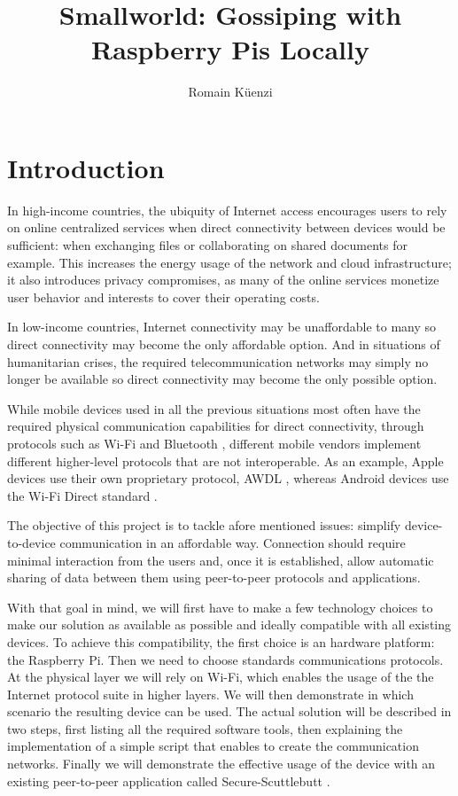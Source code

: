 \documentclass[a4paper,11pt,oneside]{report}
\title{Smallworld: Gossiping with Raspberry Pis Locally}
\author{Romain Küenzi}
\begin{document}
\maketitle

\maketoc

\chapter{Introduction}

In high-income countries, the ubiquity of Internet access encourages users to rely on online centralized services when direct connectivity between devices would be sufficient: when exchanging files or collaborating on shared documents for example. This increases the energy usage of the network and cloud infrastructure; it also introduces privacy compromises, as many of the online services monetize user behavior and interests to cover their operating costs.

In low-income countries, Internet connectivity may be unaffordable to many so direct connectivity may become the only affordable option. And in situations of humanitarian crises, the required telecommunication networks may simply no longer be available so direct connectivity may become the only possible option.

While mobile devices used in all the previous situations most often have the required physical communication capabilities for direct connectivity, through protocols such as Wi-Fi \cite{wifi2016} and Bluetooth \cite{bluetooth}, different mobile vendors implement different higher-level protocols that are not interoperable. As an example, Apple devices use their own proprietary protocol, AWDL \cite{appleAWDL}, whereas Android devices use the Wi-Fi Direct standard \cite{wifiDirect}.

The objective of this project is to tackle afore mentioned issues: simplify device-to-device communication in an affordable way. Connection should require minimal interaction from the users and, once it is established, allow automatic sharing of data between them using peer-to-peer protocols and applications.

With that goal in mind, we will first have to make a few technology choices to make our solution as available as possible and ideally compatible with all existing devices. To achieve this compatibility, the first choice is an hardware platform: the Raspberry Pi. Then we need to choose standards communications protocols. At the physical layer we will rely on Wi-Fi, which enables the usage of the the Internet protocol suite in higher layers. We will then demonstrate in which scenario the resulting device can be used. The actual solution will be described in two steps, first listing all the required software tools, then explaining the implementation of a simple script that enables to create the communication networks. Finally we will demonstrate the effective usage of the device with an existing peer-to-peer application called Secure-Scuttlebutt \cite{tarr2019secure}.
\end{document}
